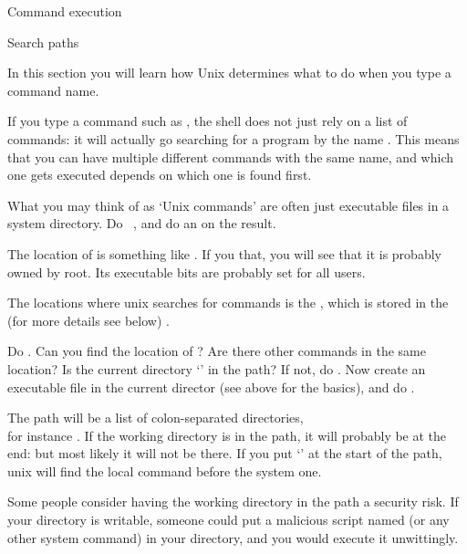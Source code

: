  {Command execution}

 {Search paths}
\label{sec:PATH}

\begin{purpose}
  In this section you will learn how Unix determines what to do when
  you type a command name.
\end{purpose}

If you type a command such as , the shell does not just rely on
a list of commands: it will actually go searching for a program by the
name . This means that you can have multiple different commands
with the same name, and which one gets executed depends on which one
is found first.

\begin{exercise}
  What you may think of as `Unix commands' are often just executable
  files in a system directory. Do ~, and do
  an  on the result.
\end{exercise}
\begin{outcome}
  The location of  is something like . If you
     that, you will see that it is probably owned by root. Its
    executable bits are probably set for all users.
\end{outcome}

The locations where unix searches for commands is the
,
which is stored in the  (for more
details see below) .

\begin{exercise}
  Do . Can you find the location of ?  Are there
  other commands in the same location? Is the current directory
  `' in the path? If not, do . Now
  create an executable file  in the current director (see above
  for the basics), and do .
\end{exercise}
\begin{outcome}
  The path will be a list of colon-separated directories,\\ for
  instance . If the working
  directory is in the path, it will probably be at the end:
    but most likely it will not be there. If you
  put `' at the start of the path, unix will find the local
   command before the system one.
\end{outcome}

Some people consider having the working directory in the path a
security risk. If your directory is writable, someone could put a
malicious script named  (or any other system command) in your
directory, and you would execute it unwittingly.

